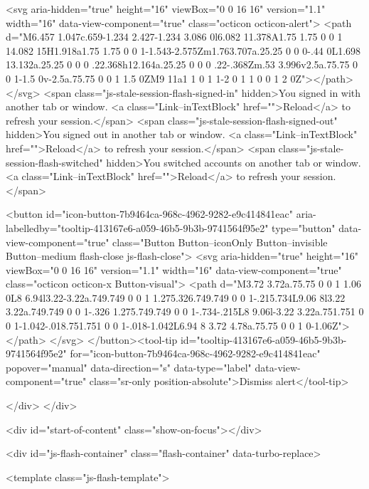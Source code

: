        <svg aria-hidden="true" height="16" viewBox="0 0 16 16" version="1.1" width="16" data-view-component="true" class="octicon octicon-alert">
    <path d="M6.457 1.047c.659-1.234 2.427-1.234 3.086 0l6.082 11.378A1.75 1.75 0 0 1 14.082 15H1.918a1.75 1.75 0 0 1-1.543-2.575Zm1.763.707a.25.25 0 0 0-.44 0L1.698 13.132a.25.25 0 0 0 .22.368h12.164a.25.25 0 0 0 .22-.368Zm.53 3.996v2.5a.75.75 0 0 1-1.5 0v-2.5a.75.75 0 0 1 1.5 0ZM9 11a1 1 0 1 1-2 0 1 1 0 0 1 2 0Z"></path>
</svg>
        <span class="js-stale-session-flash-signed-in" hidden>You signed in with another tab or window. <a class="Link--inTextBlock" href="">Reload</a> to refresh your session.</span>
        <span class="js-stale-session-flash-signed-out" hidden>You signed out in another tab or window. <a class="Link--inTextBlock" href="">Reload</a> to refresh your session.</span>
        <span class="js-stale-session-flash-switched" hidden>You switched accounts on another tab or window. <a class="Link--inTextBlock" href="">Reload</a> to refresh your session.</span>

    <button id="icon-button-7b9464ca-968c-4962-9282-e9c414841eac" aria-labelledby="tooltip-413167e6-a059-46b5-9b3b-9741564f95e2" type="button" data-view-component="true" class="Button Button--iconOnly Button--invisible Button--medium flash-close js-flash-close">  <svg aria-hidden="true" height="16" viewBox="0 0 16 16" version="1.1" width="16" data-view-component="true" class="octicon octicon-x Button-visual">
    <path d="M3.72 3.72a.75.75 0 0 1 1.06 0L8 6.94l3.22-3.22a.749.749 0 0 1 1.275.326.749.749 0 0 1-.215.734L9.06 8l3.22 3.22a.749.749 0 0 1-.326 1.275.749.749 0 0 1-.734-.215L8 9.06l-3.22 3.22a.751.751 0 0 1-1.042-.018.751.751 0 0 1-.018-1.042L6.94 8 3.72 4.78a.75.75 0 0 1 0-1.06Z"></path>
</svg>
</button><tool-tip id="tooltip-413167e6-a059-46b5-9b3b-9741564f95e2" for="icon-button-7b9464ca-968c-4962-9282-e9c414841eac" popover="manual" data-direction="s" data-type="label" data-view-component="true" class="sr-only position-absolute">Dismiss alert</tool-tip>


  
</div>
    </div>

  <div id="start-of-content" class="show-on-focus"></div>








    <div id="js-flash-container" class="flash-container" data-turbo-replace>




  <template class="js-flash-template">
    
